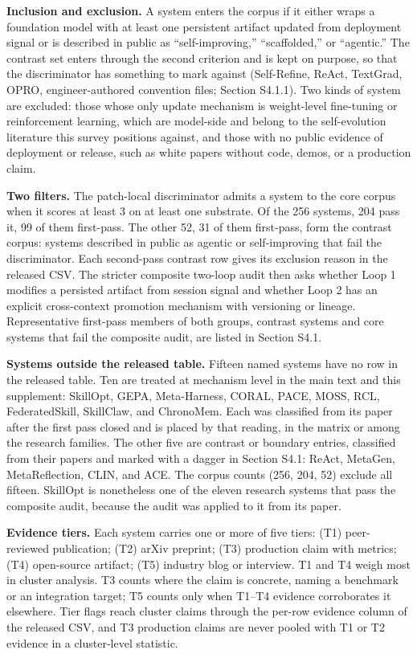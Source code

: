 \documentclass[
]{article}
\newcounter{none} %
\begin{document}
\textbf{Inclusion and exclusion.} A system enters the corpus if it
either wraps a foundation model with at least one persistent artifact
updated from deployment signal or is described in public as
``self-improving,'' ``scaffolded,'' or ``agentic.'' The contrast set
enters through the second criterion and is kept on purpose, so that the
discriminator has something to mark against (Self-Refine, ReAct,
TextGrad, OPRO, engineer-authored convention files; Section S4.1.1). Two
kinds of system are excluded: those whose only update mechanism is
weight-level fine-tuning or reinforcement learning, which are model-side
and belong to the self-evolution literature this survey positions
against, and those with no public evidence of deployment or release,
such as white papers without code, demos, or a production claim.

\textbf{Two filters.} The patch-local discriminator admits a system to
the core corpus when it scores at least 3 on at least one substrate. Of
the 256 systems, 204 pass it, 99 of them first-pass. The other 52, 31 of
them first-pass, form the contrast corpus: systems described in public
as agentic or self-improving that fail the discriminator. Each
second-pass contrast row gives its exclusion reason in the released CSV.
The stricter composite two-loop audit then asks whether Loop 1 modifies
a persisted artifact from session signal and whether Loop 2 has an
explicit cross-context promotion mechanism with versioning or lineage.
Representative first-pass members of both groups, contrast systems and
core systems that fail the composite audit, are listed in Section S4.1.

\textbf{Systems outside the released table.} Fifteen named systems have
no row in the released table. Ten are treated at mechanism level in the
main text and this supplement: SkillOpt, GEPA, Meta-Harness, CORAL,
PACE, MOSS, RCL, FederatedSkill, SkillClaw, and ChronoMem. Each was
classified from its paper after the first pass closed and is placed by
that reading, in the matrix or among the research families. The other
five are contrast or boundary entries, classified from their papers and
marked with a dagger in Section S4.1: ReAct, MetaGen, MetaReflection,
CLIN, and ACE. The corpus counts (256, 204, 52) exclude all fifteen.
SkillOpt is nonetheless one of the eleven research systems that pass the
composite audit, because the audit was applied to it from its paper.

\textbf{Evidence tiers.} Each system carries one or more of five tiers:
(T1) peer-reviewed publication; (T2) arXiv preprint; (T3) production
claim with metrics; (T4) open-source artifact; (T5) industry blog or
interview. T1 and T4 weigh most in cluster analysis. T3 counts where the
claim is concrete, naming a benchmark or an integration target; T5
counts only when T1--T4 evidence corroborates it elsewhere. Tier flags
reach cluster claims through the per-row evidence column of the released
CSV, and T3 production claims are never pooled with T1 or T2 evidence in
a cluster-level statistic.
\end{document}
